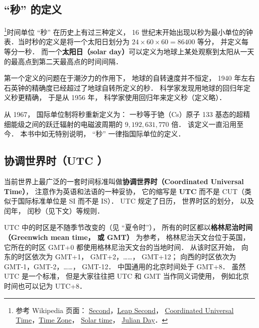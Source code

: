 
\begin{issues}
\end{issues}

\subsection{“秒” 的定义}
\footnote{参考 Wikipedia 页面： \href{https://en.wikipedia.org/wiki/Second}{Second}，\href{https://en.wikipedia.org/wiki/Leap_second}{Leap Second}， \href{https://en.wikipedia.org/wiki/Coordinated_Universal_Time}{Coordinated Universal Time}，\href{https://en.wikipedia.org/wiki/Time_zone}{Time Zone}， \href{https://en.wikipedia.org/wiki/Solar_time}{Solar time}， \href{https://en.wikipedia.org/wiki/Julian_day}{Julian Day}．}时间单位 “秒” 在历史上有过三种定义， 16 世纪末开始出现以秒为最小单位的钟表．当时秒的定义是将一个太阳日划分为 $24\times60\times60 = 86400$ 等分， 并定义每等分一秒． 而一个\textbf{太阳日（solar day）}可以定义为地球上某处观察到太阳从一天的最高点到第二天最高点的时间间隔．

第一个定义的问题在于潮汐力的作用下， 地球的自转速度并不恒定， 1940 年左右石英钟的精确度已经超过了地球自转所定义的秒． 科学家发现用地球的回归年定义秒更精确， 于是从 1956 年， 科学家使用回归年来定义秒（定义略）．

从 1967， 国际单位制将秒重新定义为： 一秒等于铯（Cs）原子 133 基态的超精细能级之间的跃迁辐射的电磁波周期的 $9,192,631,770$ 倍． 该定义一直沿用至今． 本书中如无特别说明， “秒” 一律指国际单位的定义．

\subsection{协调世界时（UTC ）}
当前世界上最广泛的一套时间标准叫做\textbf{协调世界时（Coordinated Universal Time）}， 注意作为英语和法语的一种妥协， 它的缩写是 \textbf{UTC} 而不是 CUT（类似于国际标准单位是 SI 而不是 IS）． UTC 规定了日历， 世界时区的划分， 以及闰年， 闰秒（见下文）等规则．

UTC 中的时区是不随季节改变的（见 “夏令时”）， 所有的时区都以\textbf{格林尼治时间（Greenwich mean time， 或 GMT）} 为参考， 格林尼治天文台位于英国， 它所在的时区 GMT+0 都使用格林尼治天文台的当地时间． 从该时区开始， 向东的时区依次为 GMT+1， GMT+2，……， GMT+12； 向西的时区依次为 GMT-1，GMT-2，……， GMT-12． 中国通用的北京时间处于 GMT+8． 虽然 UTC 是一个标准， 但是大家往往把 UTC 和 GMT 当作同义词使用， 例如北京时间也可以记为 UTC+8．

